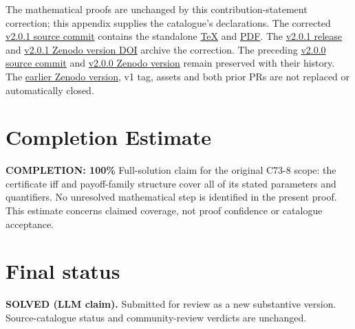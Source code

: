 \documentclass[11pt,a4paper]{article}
\theoremstyle{definition}
\theoremstyle{remark}
\begin{document}
The mathematical proofs are unchanged by this contribution-statement
correction; this appendix supplies the catalogue's declarations.
The corrected
\href{https://github.com/jbaelaw/borel-game-value-characterization/tree/182ccdaad441bd6723c2d683452a19ee3b31a43b}{v2.0.1 source commit}
contains the standalone
\href{https://github.com/jbaelaw/borel-game-value-characterization/blob/182ccdaad441bd6723c2d683452a19ee3b31a43b/paper/Proof.tex}{TeX}
and
\href{https://github.com/jbaelaw/borel-game-value-characterization/blob/182ccdaad441bd6723c2d683452a19ee3b31a43b/paper/Proof.pdf}{PDF}.
The
\href{https://github.com/jbaelaw/borel-game-value-characterization/releases/tag/v2.0.1}{v2.0.1 release}
and
\href{https://doi.org/10.5281/zenodo.23290425}{v2.0.1 Zenodo version DOI}
archive the correction. The preceding
\href{https://github.com/jbaelaw/borel-game-value-characterization/tree/31c8af23d55dc93e3f1839b2b16d34978375c4c0}{v2.0.0 source commit}
and \href{https://doi.org/10.5281/zenodo.23290245}{v2.0.0 Zenodo version}
remain preserved with their history. The
\href{https://doi.org/10.5281/zenodo.23286393}{earlier Zenodo version},
v1 tag, assets and both prior PRs are not replaced or automatically closed.

\section{Completion Estimate}
\noindent\textbf{COMPLETION: 100\%}
Full-solution claim for the original C73-8 scope: the certificate iff
and payoff-family structure cover all of its stated parameters and
quantifiers. No unresolved mathematical step is identified in the
present proof. This estimate concerns claimed coverage, not proof
confidence or catalogue acceptance.

\section*{Final status}
\textbf{SOLVED (LLM claim).} Submitted for review as a new substantive
version. Source-catalogue status and community-review verdicts are
unchanged.
\end{document}
